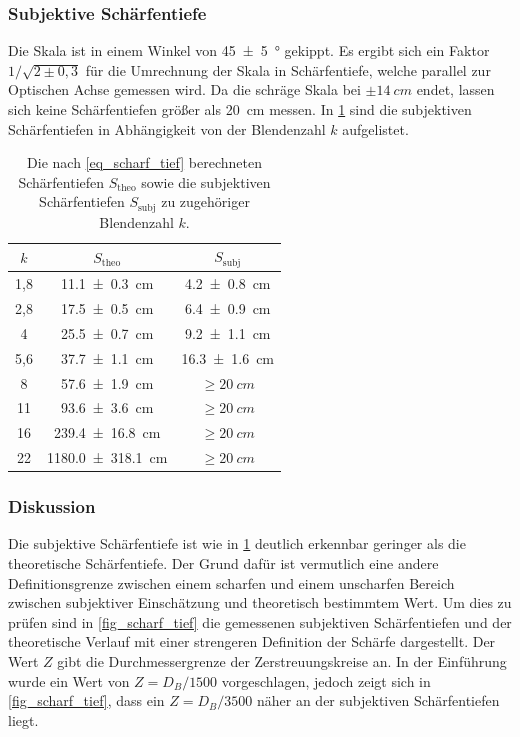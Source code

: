 \documentclass[
	a4paper,
	12pt,
	pagesize,
	ngerman
]{scrartcl}
\begin{document}
	\subsubsection*{Subjektive Schärfentiefe}
	Die Skala ist in einem Winkel von \SI{45+-5}{\degree} gekippt.
	Es ergibt sich ein Faktor $1/\sqrt{2\pm 0,3}$ für die Umrechnung der Skala in Schärfentiefe, welche parallel zur Optischen Achse gemessen wird.
	Da die schräge Skala bei $\pm\SI{14}{cm}$ endet, lassen sich keine Schärfentiefen größer als \SI{20}{cm} messen.
	In \cref{tab_scharf_tief} sind die subjektiven Schärfentiefen in Abhängigkeit von der Blendenzahl $k$ aufgelistet.
	\begin{table}[H]
		\centering
		\begin{tabular}{ c | c | c}
			$k$ 	& $S_\text{theo}$ 		& $S_\text{subj}$ \\ \hline
			1,8 	& \SI{11,1 +- 0,3}{cm} 		& \SI{4,2 +- 0,8}{cm}\\
			2,8 	& \SI{17,5 +- 0,5}{cm}		& \SI{6,4 +- 0,9}{cm} \\
			4 	& \SI{25,5 +- 0,7}{cm}		& \SI{9,2 +- 1,1}{cm} \\
			5,6 	& \SI{37,7 +- 1,1}{cm}		& \SI{16,3 +- 1,6}{cm} \\
			8 	& \SI{57,6 +- 1,9}{cm}		& $\geq\SI{20}{cm}$ \\
			11 	& \SI{93,6 +- 3,6}{cm}		& $\geq\SI{20}{cm}$ \\
			16 	& \SI{239,4 +- 16,8}{cm}	& $\geq\SI{20}{cm}$ \\
			22 	& \SI{1180,0 +- 318,1}{cm}	& $\geq\SI{20}{cm}$ \\
		\end{tabular}
		\caption{Die nach \cref{eq_scharf_tief} berechneten Schärfentiefen $S_\text{theo}$ sowie die subjektiven Schärfentiefen $S_\text{subj}$ zu zugehöriger Blendenzahl $k$. } %
		\label{tab_scharf_tief} 
	\end{table}


	
	\subsubsection{Diskussion}
	Die subjektive Schärfentiefe ist wie in \cref{tab_scharf_tief} deutlich erkennbar  geringer als die theoretische Schärfentiefe.
	Der Grund dafür ist vermutlich eine andere Definitionsgrenze zwischen einem scharfen und einem unscharfen Bereich zwischen subjektiver Einschätzung und theoretisch bestimmtem Wert.
	Um dies zu prüfen sind in \cref{fig_scharf_tief} die gemessenen subjektiven Schärfentiefen und der theoretische Verlauf mit einer strengeren Definition der Schärfe dargestellt.
	Der Wert $Z$ gibt die Durchmessergrenze der Zerstreuungskreise an. 
	In der Einführung wurde ein Wert von $Z=D_B/1500$ vorgeschlagen, jedoch zeigt sich in \cref{fig_scharf_tief}, dass ein $Z=D_B/3500$ näher an der subjektiven Schärfentiefen liegt.
\end{document}
